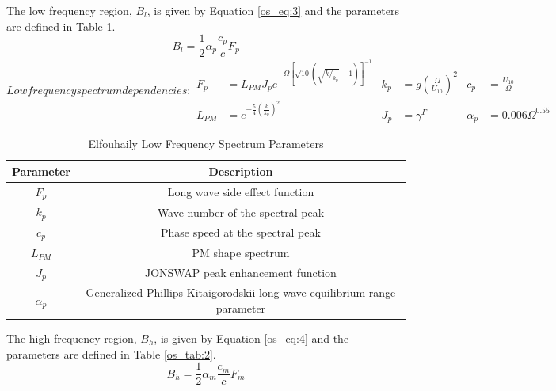 The low frequency region, $B_l$, is given by Equation \ref{os_eq:3} and the parameters are defined in Table \ref{os_tab:1}.
\begin{equation}
  \label{os_eq:3}
 B_l = \frac{1}{2} \alpha_p \frac{c_p}{c} F_p
\end{equation}
\renewcommand{\baselinestretch}{2} \small\normalsize
\begin{subequations}
   Low frequency spectrum dependencies:
\begin{align*}
  F_p &= L_{PM}J_pe^{-\Omega\left[\sqrt{10}\left(\sqrt{k/_{k_p}} - 1 \right) \right]^{-1}} &  k_p &= g\left(\frac{\Omega}{U_{10}}\right)^2 & c_p &= \frac{U_{10}}{\Omega} \\
   L_{PM} &=e^{-\frac{5}{4}\left(\frac{k}{k_p} \right)^2} &  J_p &= \gamma^\Gamma  & \alpha_p &= 0.006\Omega^{0.55} 
\end{align*}
\end{subequations}
\renewcommand{\baselinestretch}{2} \small\normalsize
\begin{table}[H]
\begin{center}
  \begin{tabular} {|c | c |}
    \hline
  \bf{Parameter} & \bf{Description} \\ \hline
  $F_p$ & Long wave side effect function \\ \hline
  $k_p$ &  Wave number of the spectral peak \\ \hline
  $c_p$ &  Phase speed at the spectral peak \\ \hline
  $L_{PM}$ & PM shape spectrum \\ \hline
  $J_p$ & JONSWAP peak enhancement function \\ \hline
   $\alpha_p$ & Generalized Phillips-Kitaigorodskii long wave equilibrium range parameter\\ \hline
\end{tabular}
  \renewcommand{\baselinestretch}{1} \small\normalsize
  \begin{quote}
    \caption[Elfouhaily Low Frequency Spectrum Parameters]{Elfouhaily Low Frequency Spectrum Parameters\label{os_tab:1}}
  \end{quote}
\end{center}
\end{table}
\renewcommand{\baselinestretch}{2} \small\normalsize
The high frequency region, $B_h$, is given by Equation \ref{os_eq:4} and the parameters are defined in Table \ref{os_tab:2}.
\begin{equation}
  \label{os_eq:4}
 B_h = \frac{1}{2} \alpha_m \frac{c_m}{c} F_m
\end{equation}
